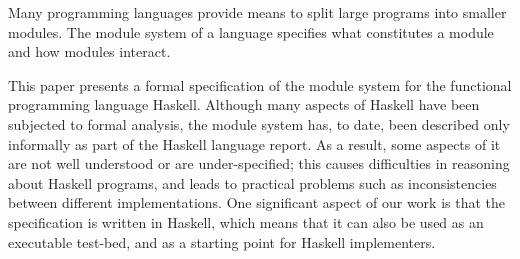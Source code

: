 Many programming languages provide means to split large programs
into smaller modules.  The module system of a language specifies what
constitutes a module and how modules interact.

This paper presents a formal specification of the module system for
the functional programming language Haskell.  Although many aspects of
Haskell have been subjected to formal analysis, the module system has,
to date, been described only informally as part of the Haskell language
report.  As a result, some aspects of it are not well understood or are
under-specified; this causes difficulties in reasoning about Haskell
programs, and leads to practical problems such as inconsistencies between
different implementations.  One significant aspect of our work is that
the specification is written in Haskell, which means that it can also
be used as an executable test-bed, and as a starting point for Haskell
implementers.
